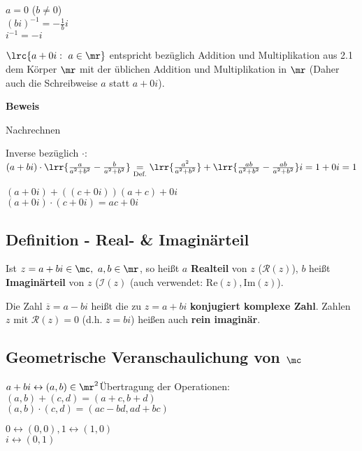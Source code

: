 		$a=0$ ($b\neq 0$)\\
		$(bi)^{-1}=-\frac{1}{b}i$\\
		$i^{-1}=-i$
		\item $\lrc{a+0i:\ a\in\mr}$ entspricht bezüglich Addition und Multiplikation aus 2.1 dem Körper $\mr$ mit der üblichen Addition und Multiplikation in $\mr$ (Daher auch die Schreibweise $a$ statt $a+0i$).
	\subExEnd

	\textbf{Beweis}
		\item Nachrechnen
		\item Inverse bezüglich $\cdot$:\\
		$(a+bi)\cdot\lrr{\frac{a}{a^2+b^2}-\frac{b}{a^2+b^2}}\underset{\mbox{\scriptsize Def.}}{=}\lrr{\frac{a^2}{a^2+b^2}}+\lrr{\frac{ab}{a^2+b^2}-\frac{ab}{a^2+b^2}}i=1+0i=1$
		\item $(a+0i)+((c+0i))(a+c)+0i$\\
		$(a+0i)\cdot(c+0i)=ac+0i$
	\subExEnd

\subsection{Definition - Real- \& Imaginärteil}
	Ist $z=a+bi\in\mc,\ a,b\in\mr$, so heißt $a$ \textbf{Realteil} von $z$ ($\mathcal{R}(z)$), $b$ heißt \textbf{Imaginärteil} von $z$ ($\mathcal{I}(z)$ (auch verwendet: $\mbox{Re}(z),\mbox{Im}(z)$).

	Die Zahl $\overline{z}=a-bi$ heißt die zu $z=a+bi$ \textbf{konjugiert komplexe Zahl}. Zahlen $z$ mit $\mathcal{R}(z)=0$ (d.h. $z=bi$) heißen auch \textbf{rein imaginär}.

\subsection{Geometrische Veranschaulichung von \texorpdfstring{$\mc$}{C}}
	$a+bi\leftrightarrow(a,b)\in\mr^2$\quad Übertragung der Operationen:\\
	$(a,b)+(c,d)=(a+c,b+d)$\\
	$(a,b)\cdot(c,d)=(ac-bd,ad+bc)$

	$0\leftrightarrow(0,0), 1\leftrightarrow(1,0)$\\
	$i\leftrightarrow(0,1)$

